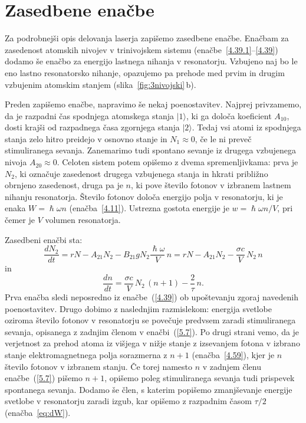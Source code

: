 \section{Zasedbene enačbe}
Za podrobnejši opis delovanja laserja zapišemo zasedbene enačbe. 
Enačbam za zasedenost atomskih nivojev 
v trinivojskem sistemu (enačbe~\ref{4.39.1}--\ref{4.39}) dodamo še enačbo za 
energijo lastnega nihanja v resonatorju. Vzbujeno naj bo 
le eno lastno resonatorsko nihanje, opazujemo pa prehode med prvim 
in drugim vzbujenim atomskim stanjem (slika~\ref{fig:3nivojski}\,b). 

Preden zapišemo enačbe, napravimo še nekaj poenostavitev. Najprej privzamemo, 
da je razpadni čas spodnjega atomskega stanja $|1\rangle$, 
ki ga določa koeficient $A_{10}$, dosti krajši od razpadnega
časa zgornjega stanja $|2\rangle$. Tedaj vsi atomi iz spodnjega stanja zelo 
hitro preidejo v osnovno stanje in $N_1 \approx 0$, če le ni preveč
stimuliranega sevanja. Zanemarimo tudi spontano sevanje iz drugega vzbujenega
nivoja $A_{20} \approx 0$. Celoten sistem potem opišemo z dvema 
spremenljivkama: prva je $N_2$, ki označuje zasedenost drugega vzbujenega
stanja in hkrati približno obrnjeno zasedenost, druga pa je $n$, ki pove število
fotonov v izbranem lastnem nihanju resonatorja. Število fotonov določa energijo 
polja v resonatorju, ki je enaka $W = \hslash\omega n$ (enačba~\ref{4.11}). Ustrezna
gostota energije je $w = \hslash\omega n/V$, pri čemer je $V$ volumen resonatorja.

Zasedbeni enačbi sta:
\begin{equation}
\frac{dN_2}{dt}=rN-A_{21}N_2-B_{21}gN_2\frac{\hslash \omega}{V}\,n
=rN-A_{21}N_2-\frac{\sigma c}{V}\, N_2\,n
\label{5.7}
\end{equation}
in 
\begin{equation}
\frac{dn}{dt}=\frac{\sigma c}{V}\, N_2\,(n+1)-\frac{2}{\tau}\,n.
\label{5.8}
\end{equation}
Prva enačba sledi neposredno iz enačbe~(\ref{4.39}) ob upoštevanju zgoraj navedenih
poenostavitev. Drugo  dobimo z naslednjim razmislekom: energija svetlobe 
oziroma število fotonov v resonatorju se povečuje predvsem 
zaradi stimuliranega sevanja, opisanega z zadnjim členom v enačbi~(\ref{5.7}).
Po drugi strani vemo, da je verjetnost za prehod atoma iz višjega v nižje stanje z 
izsevanjem fotona v izbrano stanje elektromagnetnega polja sorazmerna z 
$n+1$ (enačba~\ref{4.59}), kjer je $n$ število fotonov v izbranem stanju. 
Če torej namesto $n$ v zadnjem členu enačbe~(\ref{5.7}) pišemo $n+1$, 
opišemo poleg stimuliranega sevanja tudi prispevek spontanega sevanja. Dodamo še 
člen, s katerim popišemo zmanjševanje energije svetlobe v resonatorju zaradi 
izgub, kar opišemo z razpadnim časom $\tau/2$ (enačba~\ref{eq:dW}). 

